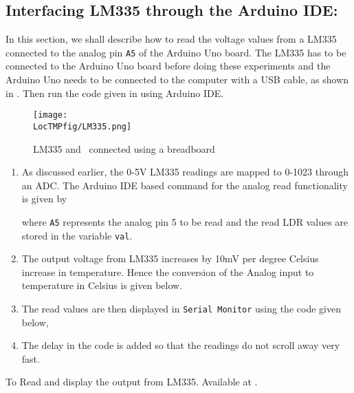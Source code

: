 \subsection{Interfacing LM335 through the Arduino IDE:}
In this section, we shall describe how to read the voltage
values from a LM335 connected to the analog pin {\tt A5} of the
Arduino Uno board. The LM335 has to be connected to the Arduino
Uno
board before doing these experiments and the Arduino Uno needs
to be connected to the computer with a USB cable, as shown in
. Then run the code given in
 using Arduino IDE.

\begin{figure}
  \centering
  \texttt{[image: \\LocTMPfig/LM335.png]}
  \caption{LM335 and \arduino\ connected using a breadboard}
  \label{fig:ard-lm335}
\end{figure}

\begin{enumerate}
\item As discussed earlier, the 0-5V LM335 readings are mapped
to 0-1023 through an ADC. The Arduino IDE based command for the
analog read functionality is given by

where {\tt A5} represents the analog pin 5 to be read and the
read LDR values are stored in the variable {\tt val}.

\item The output voltage from LM335 increases by 10mV per degree
Celsius increase in temperature.
Hence the conversion of the Analog input to temperature in
Celsius is given below.


\item The read values are then displayed in {\tt Serial Monitor}
using the code given below,


\item The delay in the code is added so that the readings do not
scroll away very fast.
      
\end{enumerate}

\begin{ardcode}
  {To Read and display the output from LM335.  Available at
    .}
  \label{ard:lm335}
  
\end{ardcode}

